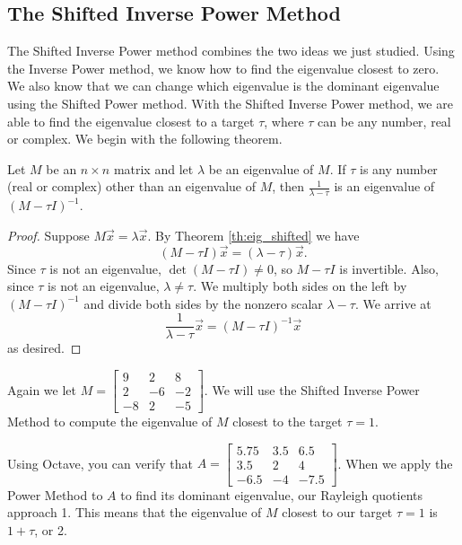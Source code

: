 \documentclass{ximera}
\begin{document}
\subsection*{The Shifted Inverse Power Method}

The Shifted Inverse Power method combines the two ideas we just studied.  Using the Inverse Power method, we know how to find the eigenvalue closest to zero.  We also know that we can change which eigenvalue is the dominant eigenvalue using the Shifted Power method.  With the Shifted Inverse Power method, we are able to find the eigenvalue closest to a target $\tau$, where $\tau$ can be any number, real or complex.    We begin with the following theorem.

\begin{theorem}\label{th:eig_shifted_inverse}
Let $M$ be an $n \times n$ matrix and let $\lambda$ be an eigenvalue of $M$.  If $\tau$ is any number (real or complex) other than an eigenvalue of $M$, then $\frac{1}{\lambda - \tau}$ is an eigenvalue of $(M - \tau I)^{-1}$.
\end{theorem}

\begin{proof}
Suppose $M\vec{x}=\lambda\vec{x}$.  By Theorem \ref{th:eig_shifted} we have 
$$(M - \tau I)\vec{x}=(\lambda-\tau)\vec{x}.$$  
Since $\tau$ is not an eigenvalue, $\det (M - \tau I) \ne 0$, so $M - \tau I$ is invertible.  Also, since $\tau$ is not an eigenvalue, $\lambda \ne \tau$.  We multiply both sides on the left by $(M - \tau I)^{-1}$ and divide both sides by the nonzero scalar $\lambda - \tau$.  We arrive at 
$$\frac{1}{\lambda - \tau}\vec{x} = (M - \tau I)^{-1}\vec{x}$$
as desired.
\end{proof}

Again we let $M=\left[ \begin{array}{rrr}
9 & 2 & 8 \\
2 & -6 & -2 \\
-8 & 2 & -5
\end{array}\right]$.  We will use the Shifted Inverse Power Method to compute the eigenvalue of $M$ closest to the target $\tau = 1$. 

Using Octave, you can verify that $A=\left[ \begin{array}{rrr}
5.75 & 3.5 & 6.5 \\
3.5 & 2 & 4 \\
-6.5 & -4 & -7.5
\end{array}\right]$.  When we apply the Power Method to $A$ to find its dominant eigenvalue, our Rayleigh quotients approach 1.  This means that the eigenvalue of $M$ closest to our target $\tau = 1$ is $1+\tau$, or 2.
\end{document}
